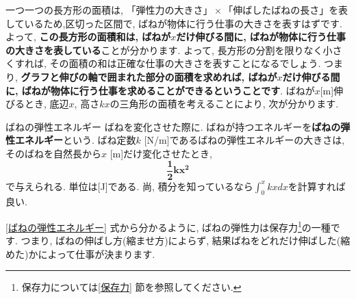 \documentclass[11pt,dvipdfmx]{jsarticle}
\numberwithin{equation}{section} %
\begin{document}
一つ一つの長方形の面積は, $「弾性力の大きさ」\times「伸ばしたばねの長さ」$を表しているため,区切った区間で, ばねが物体に行う仕事の大きさを表すはずです. よって, \textbf{この長方形の面積和は, ばねが$x$だけ伸びる間に, ばねが物体に行う仕事の大きさを表している}ことが分かります. よって, 長方形の分割を限りなく小さくすれば, その面積の和は正確な仕事の大きさを表すことになるでしょう. つまり, \textbf{グラフと伸びの軸で囲まれた部分の面積を求めれば, ばねが$x$だけ伸びる間に, ばねが物体に行う仕事を求めることができるということです}. ばねが$x$[m]伸びるとき, 底辺$x$, 高さ$kx$の三角形の面積を考えることにより, 次が分かります.
\begin{freebox}{ばねの弾性エネルギー}
ばねを変化させた際に. ばねが持つエネルギーを\textbf{ばねの弾性エネルギー}という. ばね定数$k$ [N/m]であるばねの弾性エネルギーの大きさは, そのばねを自然長から$x$ [m]だけ変化させたとき, 
\begin{equation}
    \bm{\frac{1}{2}kx^2}\label{ばねの弾性エネルギー}
\end{equation}
で与えられる. 単位は[J]である. 尚, 積分を知っているなら$\int_{0}^{x}kxdx$を計算すれば良い.
\end{freebox}
\eqref{ばねの弾性エネルギー} 式から分かるように, ばねの弾性力は保存力\footnote{保存力については\ref{保存力} 節を参照してください.}の一種です. つまり, ばねの伸ばし方(縮ませ方)によらず, 結果ばねをどれだけ伸ばした(縮めた)かによって仕事が決まります. 
\end{document}
